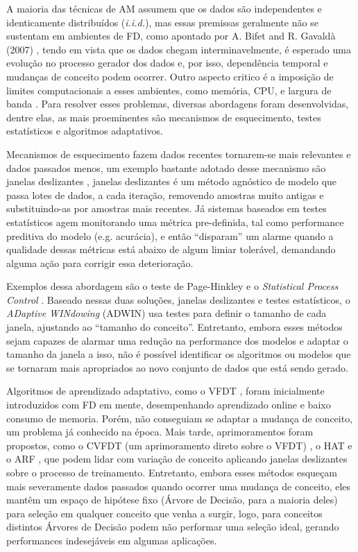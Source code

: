A maioria das técnicas de AM assumem que os dados são independentes e
identicamente distribuídos (\textit{i.i.d.}), mas essas premissas geralmente não
se sustentam em ambientes de FD, como apontado por A. Bifet and R.
Gavald\`a (2007) \cite{bifet2007learning}, tendo em vista que os dados chegam
interminavelmente, é esperado uma evolução no processo gerador dos dados e, por isso, dependência temporal e mudanças de conceito podem ocorrer.  Outro aspecto critico é a imposição de limites
computacionais a esses ambientes, como memória, CPU, e largura de banda
\cite{bifet2010moa, gama2012survey}. Para resolver esses problemas, diversas
abordagens foram desenvolvidas, dentre elas, as mais proeminentes são
mecanismos de esquecimento, testes estatísticos e algoritmos adaptativos.

Mecanismos de esquecimento fazem dados recentes tornarem-se mais relevantes e
dados passados menos, um exemplo bastante adotado desse mecanismo são janelas deslizantes
\cite{gaber2005mining}, janelas deslizantes é um método agnóstico de modelo que passa lotes de dados, a cada iteração, removendo amostras muito antigas e substituindo-as por amostras mais recentes. Já sistemas baseados em testes estatísticos agem monitorando uma métrica
pre-definida, tal como performance preditiva do modelo (e.g. acurácia), e então ``disparam'' um
alarme quando a qualidade dessas métricas está abaixo de algum limiar
tolerável, demandando alguma ação para corrigir essa deterioração.

Exemplos dessa abordagem são o teste de Page-Hinkley e o \textit{Statistical
Process Control} \cite{gama2010knowledge}.
Baseado nessas duas soluções, janelas deslizantes e testes estatísticos, o \textit{ADaptive WINdowing} (ADWIN) \cite{bifet2007learning} usa testes para definir o tamanho de cada janela, ajustando ao ``tamanho do conceito''.
Entretanto, embora esses métodos sejam capazes de alarmar uma redução na performance dos modelos e adaptar o tamanho da janela a isso, não é possível identificar os algoritmos ou modelos que se tornaram mais apropriados ao novo conjunto de dados que está sendo gerado.

Algoritmos de aprendizado adaptativo, como o VFDT \cite{domingos2000mining},
foram inicialmente introduzidos com FD em mente, desempenhando aprendizado online e baixo consumo de memoria. Porém, não conseguiam se adaptar a mudança de conceito, um problema já conhecido na época.
Mais tarde, aprimoramentos foram propostos, como o CVFDT (um aprimoramento direto sobre o VFDT) \cite{hulten2001mining}, o HAT \cite{bifet2009adaptive} e o ARF \cite{gomes2017adaptive}, que podem lidar com variação de conceito aplicando janelas deslizantes sobre o processo de treinamento.
Entretanto, embora esses métodos esqueçam mais severamente dados passados quando ocorrer uma mudança de conceito, eles mantêm um espaço de hipótese fixo (Árvore de Decisão, para a maioria deles) para seleção em qualquer conceito que venha a surgir, logo, para conceitos distintos Árvores de Decisão podem não performar uma seleção ideal, gerando performances indesejáveis em algumas aplicações.

